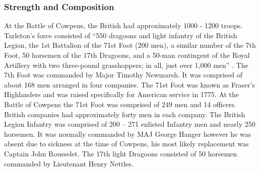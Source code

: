 %
%
%
%
%
%
%
%
%
%
%

\subsubsection{Strength and Composition}


At the Battle of Cowpens, the British had approximately 1000 - 1200 troops.
Tarleton’s force consisted of “550 dragoons and light infantry of the British
Legion, the 1st Battalion of the 71st Foot (200 men), a similar number of the
7th Foot, 50 horsemen of the 17th Dragoons, and a 50-man contingent of the Royal
Artillery with two three-pound grasshoppers; in all, just over 1,000 men”
\cite[p.325]{stephenson_patriot_2007}.  The 7th Foot was commanded by Major Timothy Newmarsh.  It
was comprised of about 168 men arranged in four companies.  The 71st Foot was
known as Fraser’s Highlanders and was raised specifically for American service
in 1775.  At the Battle of Cowpens the 71st Foot was comprised of 249 men and 14
officers.  British companies had approximately forty men in each company.  The
British Legion Infantry was comprised of 200 – 271 enlisted Infantry men and
nearly 250 horsemen. It was normally commanded by MAJ George Hanger however he
was absent due to sickness at the time of Cowpens, his most likely replacement
was Captain John Rousselet.  The 17th light Dragoons consisted of 50 horsemen
commanded by Lieutenant Henry Nettles.        

